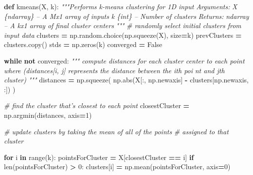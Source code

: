 \documentclass[
  a4paper,
,tablecaptionabove
]{scrartcl}
\newenvironment{Shaded}{\begin{snugshade}}{\end{snugshade}}
\newcommand{\BuiltInTok}[1]{#1}
\newcommand{\CommentTok}[1]{\textcolor[rgb]{0.56,0.35,0.01}{\textit{#1}}}
\newcommand{\ControlFlowTok}[1]{\textcolor[rgb]{0.13,0.29,0.53}{\textbf{#1}}}
\newcommand{\DecValTok}[1]{\textcolor[rgb]{0.00,0.00,0.81}{#1}}
\newcommand{\KeywordTok}[1]{\textcolor[rgb]{0.13,0.29,0.53}{\textbf{#1}}}
\newcommand{\NormalTok}[1]{#1}
\newcommand{\OperatorTok}[1]{\textcolor[rgb]{0.81,0.36,0.00}{\textbf{#1}}}
\newcommand{\VariableTok}[1]{\textcolor[rgb]{0.00,0.00,0.00}{#1}}
\begin{document}
\begin{Shaded}
\begin{Highlighting}[]
\KeywordTok{def}\NormalTok{ kmeans(X, k):}
    \CommentTok{"""Performs k-means clustering for 1D input}
\CommentTok{    Arguments:}
\CommentTok{    X \{ndarray\} -- A Mx1 array of inputs}
\CommentTok{    k \{int\} -- Number of clusters}
\CommentTok{    Returns:}
\CommentTok{    ndarray -- A kx1 array of final cluster centers}
\CommentTok{    """}
    \CommentTok{# randomly select initial clusters from input data}
\NormalTok{    clusters }\OperatorTok{=}\NormalTok{ np.random.choice(np.squeeze(X), size}\OperatorTok{=}\NormalTok{k)}
\NormalTok{    prevClusters }\OperatorTok{=}\NormalTok{ clusters.copy()}
\NormalTok{    stds }\OperatorTok{=}\NormalTok{ np.zeros(k)}
\NormalTok{    converged }\OperatorTok{=} \VariableTok{False}

    \ControlFlowTok{while} \KeywordTok{not}\NormalTok{ converged:}
        \CommentTok{"""}
\CommentTok{        compute distances for each cluster center to each point}
\CommentTok{        where (distances[i, j] represents the distance between the ith poi}
\CommentTok{        nt and jth cluster)}
\CommentTok{        """}
\NormalTok{        distances }\OperatorTok{=}\NormalTok{ np.squeeze(}
\NormalTok{            np.}\BuiltInTok{abs}\NormalTok{(X[:, np.newaxis] }\OperatorTok{-}\NormalTok{ clusters[np.newaxis, :])}
\NormalTok{        )}

        \CommentTok{# find the cluster that's closest to each point}
\NormalTok{        closestCluster }\OperatorTok{=}\NormalTok{ np.argmin(distances, axis}\OperatorTok{=}\DecValTok{1}\NormalTok{)}

        \CommentTok{# update clusters by taking the mean of all of the points}
        \CommentTok{# assigned to that cluster}

        \ControlFlowTok{for}\NormalTok{ i }\KeywordTok{in} \BuiltInTok{range}\NormalTok{(k):}
\NormalTok{            pointsForCluster }\OperatorTok{=}\NormalTok{ X[closestCluster }\OperatorTok{==}\NormalTok{ i]}
            \ControlFlowTok{if} \BuiltInTok{len}\NormalTok{(pointsForCluster) }\OperatorTok{>} \DecValTok{0}\NormalTok{:}
\NormalTok{                clusters[i] }\OperatorTok{=}\NormalTok{ np.mean(pointsForCluster, axis}\OperatorTok{=}\DecValTok{0}\NormalTok{)}


\end{Highlighting}
\end{Shaded}
\end{document}
